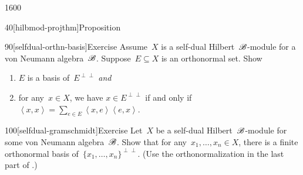 \begin{parsec}{1600}
\begin{point}{40}[hilbmod-projthm]{Proposition}
\end{point}
\begin{point}{90}[selfdual-orthn-basis]{Exercise}%
Assume~$X$ is a self-dual Hilbert~$\mathscr{B}$-module for a von Neumann
    algebra~$\mathscr{B}$.
Suppose~$E \subseteq X$ is an orthonormal set. Show
\begin{enumerate}
\item
    $E$ is a basis of~$E^{\perp\perp}$ \emph{and}
\item
    for any~$x \in X$,
        we have
    $x \in E^{\perp\perp}$
    if and only if~$\left<x,x\right> = \sum_{e \in E} \left<x,e\right>
                \left<e,x\right>$.
\end{enumerate}

\end{point}
\begin{point}{100}[selfdual-gramschmidt]{Exercise}%
Let~$X$ be a self-dual Hilbert~$\mathscr{B}$-module for some von Neumann
    algebra~$\mathscr{B}$.
Show that for any~$x_1, \ldots, x_n \in X$,
    there is a finite orthonormal basis
    of~$\{x_1, \ldots, x_n\}^{\perp\perp}$.
(Use the orthonormalization in the last part of .)
\end{point}
\end{parsec}


